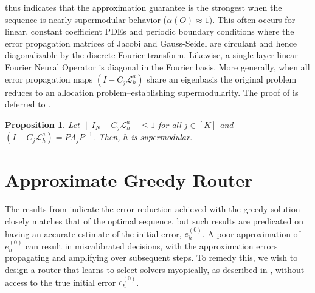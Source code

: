 \documentclass{article} %
\newtheorem{proposition}[theorem]{Proposition}
\newtheorem{corollary}[theorem]{Corollary}
\begin{document}
 thus indicates that the approximation guarantee is the strongest when the sequence is nearly supermodular behavior ($\alpha(O) \approx 1$). This often occurs for linear, constant coefficient PDEs and periodic boundary conditions where 
the error propagation matrices of Jacobi and Gauss-Seidel are circulant and hence diagonalizable by the discrete Fourier transform. Likewise, a single-layer linear Fourier Neural Operator is diagonal in the Fourier basis.
More generally, when all error propagation maps $\left(I - C_j \mathcal{L}_{h}^a\right)$ share an eigenbasis
the original problem reduces to an allocation problem--establishing supermodularity. The proof of  is deferred to .
\begin{proposition} \label{th:simultaneoussupermodular}
    Let $\|I_N - C_j\mathcal{L}_h^a\| \leq 1$ for all $j \in [K]$ and $\left(I - C_j \mathcal{L}_{h}^a\right) = P\Lambda_jP^{-1}$. Then, $h$ is supermodular. 
\end{proposition}

\section{Approximate Greedy Router} \label{sec:approxgreedy}

The results from  indicate the error reduction achieved with the greedy solution closely matches that of the optimal sequence, but such results are predicated on having an accurate estimate of the initial error, $e^{(0)}_h$. A poor approximation of $e^{(0)}_h$ can result in miscalibrated decisions, with the approximation errors propagating and amplifying over subsequent steps. To remedy this, we wish to design a router that learns to select solvers myopically, as described in , without access to the true initial error $e^{(0)}_h$. 
\end{document}
